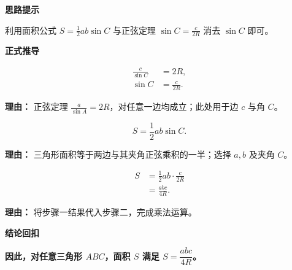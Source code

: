 \begin{proofbox}
	\textbf{\textcolor{CProof}{思路提示}}

	利用面积公式 $S=\frac12 ab\sin C$ 与正弦定理 $\sin C = \frac{c}{2R}$ 消去 $\sin C$ 即可。

	\medskip
	\textbf{\textcolor{CProof}{正式推导}}
	\begin{description}[style=nextline, leftmargin=2.8em, labelsep=0.5em, itemsep=0.55em]
		\item[\textbf{步骤一（正弦定理转化）：}]
			\[
				\begin{aligned}
					\frac{c}{\sin C} &= 2R, \\
					\sin C &= \frac{c}{2R}.
			\end{aligned}
			\]
			\par\textbf{理由：}
			正弦定理 $\frac{a}{\sin A}=2R$，对任意一边均成立；此处用于边 $c$ 与角 $C$。

		\item[\textbf{步骤二（面积公式表达）：}]
			\[
				S = \frac12 ab\sin C.
			\]
			\par\textbf{理由：}
			三角形面积等于两边与其夹角正弦乘积的一半；选择 $a,b$ 及夹角 $C$。

		\item[\textbf{步骤三（代入消元化简）：}]
			\[
				\begin{aligned}
					S &= \frac12 ab\cdot\frac{c}{2R} \\
					&= \frac{abc}{4R}.
			\end{aligned}
			\]
			\par\textbf{理由：}
			将步骤一结果代入步骤二，完成乘法运算。
	\end{description}

	\medskip
	\textbf{\textcolor{CProof}{结论回扣}}

	\textbf{因此，对任意三角形 $ABC$，面积 $S$ 满足 $S=\dfrac{abc}{4R}$。}
\end{proofbox}

